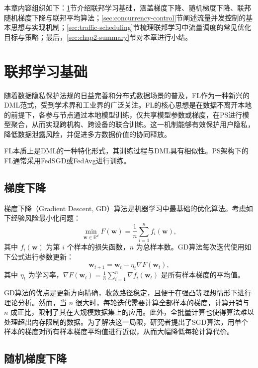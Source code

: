 \documentclass[master, vlined]{DissertUESTC}
\begin{document}
	本章内容组织如下：\ref{sec:fl-basic}节介绍联邦学习基础，涵盖梯度下降、随机梯度下降、联邦随机梯度下降与联邦平均算法；\ref{sec:concurrency-control}节阐述流量并发控制的基本思想与实现机制；\ref{sec:traffic-scheduling}节梳理联邦学习中流量调度的常见优化目标与策略；最后，\ref{sec:chap2-summary}节对本章进行小结。

	\section{联邦学习基础}
	\label{sec:fl-basic}

	随着数据隐私保护法规的日益完善和分布式数据场景的普及，FL作为一种新兴的DML范式，受到学术界和工业界的广泛关注。FL的核心思想是在数据不离开本地的前提下，各参与节点通过本地模型训练，仅共享模型参数或梯度，在PS进行模型聚合，从而实现跨机构、跨设备的联合训练。这一机制能够有效保护用户隐私，降低数据泄露风险，并促进多方数据价值的协同释放。

	FL本质上是DML的一种特化形式，其训练过程与DML具有相似性。PS架构下的FL通常采用FedSGD或FedAvg进行训练。

	\subsection{梯度下降}

	梯度下降（Gradient Descent, GD）算法是机器学习中最基础的优化算法。考虑如下经验风险最小化问题：
	\begin{equation}
		\min_{\mathbf{w} \in \mathbb{R}^d} F(\mathbf{w}) = \frac{1}{n}\sum_{i=1}^{n} f_i(\mathbf{w}),
	\end{equation}
	其中 $f_i(\mathbf{w})$ 为第 $i$ 个样本的损失函数，$n$ 为总样本数。GD算法每次迭代使用如下公式进行参数更新：
	\begin{equation}
		\mathbf{w}_{t+1} = \mathbf{w}_t - \eta_t \nabla F(\mathbf{w}_t),
	\end{equation}
	其中 $\eta_t$ 为学习率，$\nabla F(\mathbf{w}_t) = \frac{1}{n}\sum_{i=1}^{n} \nabla f_i(\mathbf{w}_t)$ 是所有样本梯度的平均值。

	GD算法的优点是更新方向精确，收敛路径稳定，且便于在强凸等理想情形下进行理论分析。然而，当 $n$ 很大时，每轮迭代需要计算全部样本的梯度，计算开销与 $n$ 成正比，限制了其在大规模数据集上的应用。此外，全批量计算也使得算法难以处理超出内存限制的数据。为了解决这一局限，研究者提出了SGD算法，用单个样本的梯度对所有样本梯度平均值进行近似，从而大幅降低每轮计算代价。

	\subsection{随机梯度下降}
\end{document}
